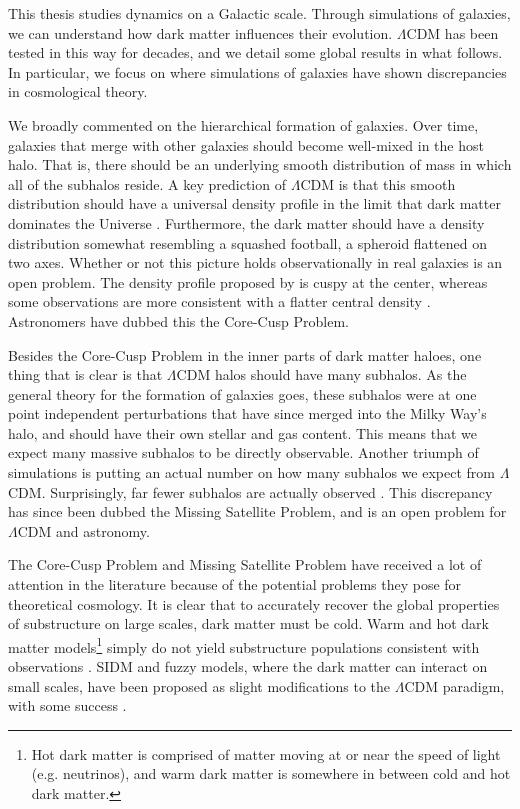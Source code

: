 This thesis studies dynamics on a Galactic scale. Through simulations of galaxies, we can understand how dark matter influences their evolution. $\Lambda$CDM has been tested in this way for decades, and we detail some global results in what follows. In particular, we focus on where simulations of galaxies have shown discrepancies in cosmological theory.

We broadly commented on the hierarchical formation of galaxies. Over time, galaxies that merge with other galaxies should become well-mixed in the host halo. That is, there should be an underlying smooth distribution of mass in which all of the subhalos reside. A key prediction of $\Lambda$CDM is that this smooth distribution should have a universal density profile in the limit that dark matter dominates the Universe \citep{nfw}. Furthermore, the dark matter should have a density distribution somewhat resembling a squashed football, a spheroid flattened on two axes. Whether or not this picture holds observationally in real galaxies is an open problem. The density profile proposed by \citet{nfw} is cuspy at the center, whereas some observations are more consistent with a flatter central density \citep{de_blok_core_cusp}. Astronomers have dubbed this the Core-Cusp Problem. 

Besides the Core-Cusp Problem in the inner parts of dark matter haloes, one thing that is clear is that $\Lambda$CDM halos should have many subhalos. As the general theory for the formation of galaxies goes, these subhalos were at one point independent perturbations that have since merged into the Milky Way's halo, and should have their own stellar and gas content. This means that we expect many massive subhalos to be directly observable. Another triumph of simulations is putting an actual number on how many subhalos we expect from $\Lambda$CDM. Surprisingly, far fewer subhalos are actually observed \citep{mooresubhalos, Klypin1999, springel2008}. This discrepancy has since been dubbed the Missing Satellite Problem, and is an open problem for $\Lambda$CDM and astronomy.


The Core-Cusp Problem and Missing Satellite Problem have received a lot of attention in the literature because of the potential problems they pose for theoretical cosmology. It is clear that to accurately recover the global properties of substructure on large scales, dark matter must be cold. Warm and hot dark matter models\footnote{Hot dark matter is comprised of matter moving at or near the speed of light (e.g. neutrinos), and warm dark matter is somewhere in between cold and hot dark matter.} simply do not yield substructure populations consistent with observations \citep[for example]{alternate_dm}. SIDM and fuzzy models, where the dark matter can interact on small scales, have been proposed as slight modifications to the $\Lambda$CDM paradigm, with some success \citep[for example]{hui_2017}. 

